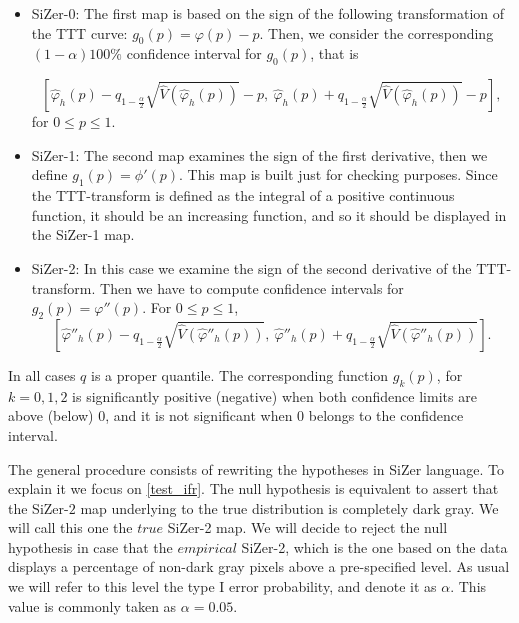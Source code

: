 \documentclass[preprint,12pt]{elsarticle}
\begin{document}
\begin{itemize}
\item SiZer-0:
\noindent The first map is based on the sign of the following transformation of the  TTT curve: $g_0(p)=\varphi(p) - p$.
Then, we consider the corresponding $(1-\alpha)100\%$ confidence interval for $g_0(p)$, that is 

\[
\left[\widehat{\varphi}_h(p)-q_{1-\frac{\alpha}{2}}\sqrt{\widehat{V}\left(\widehat{\varphi}_h(p)\right)}-p, \ \widehat{\varphi}_h(p)+q_{1-\frac{\alpha}{2}}\sqrt{\widehat{V}\left(\widehat{\varphi}_h(p)\right) }- p \right],
\]
\noindent for $0\leq p \leq 1$.


\item SiZer-1:
\noindent The second map examines the sign of the first derivative, then we define $g_1(p)=\phi'(p)$. This map is built just for checking purposes. Since the TTT-transform is defined as the integral of a positive continuous function, it should be an increasing function, and so it should be displayed in the SiZer-1 map. %

\item SiZer-2:
\noindent In this case we examine the sign of the second derivative of the TTT-transform. Then we have to compute confidence intervals for $g_2(p)=\varphi''(p)$. For $0\leq p \leq 1$,
\begin{equation}\label{ci_d2phi}
\left[\widehat{\varphi}''_h(p)-q_{1-\frac{\alpha}{2}}\sqrt{\widehat{V}\left(\widehat{\varphi}''_h(p)\right)}, \ \widehat{\varphi}''_h(p)+q_{1-\frac{\alpha}{2}}\sqrt{\widehat{V}\left(\widehat{\varphi}''_h(p)\right)}\right].
\end{equation}

\end{itemize}
In all cases $q$ is a proper quantile. The corresponding function $g_k(p)$, for $k =0,1,2$ is significantly positive (negative) when both confidence limits are above (below) 0, and it is not significant when 0 belongs to the confidence interval.

The general procedure consists of rewriting the hypotheses in SiZer language. To explain it we focus on \eqref{test_ifr}. The null hypothesis is equivalent to assert that the  SiZer-$2$ map underlying to the true distribution is completely dark gray. We will call this one the $true$ SiZer-2 map. We will decide to reject the null hypothesis in case that the $empirical$ SiZer-2, which is the one based on the data  displays a percentage of non-dark gray pixels above a pre-specified level. As usual we will refer to this level the type I error probability, and denote it as $\alpha$. This value is commonly taken as $\alpha=0.05$. 
\end{document}
